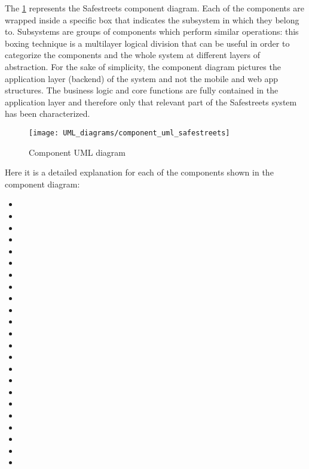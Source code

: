 The \ref{fig:component_diagram} represents the Safestreets component diagram. Each of the components are wrapped inside a specific box that indicates the subsystem in which they belong to.
\newline Subsystems are groups of components which perform similar operations: this boxing technique is a multilayer logical division that can be useful in order to categorize the components and the whole system at different layers of abstraction.
\newline For the sake of simplicity, the component diagram pictures the application layer (backend) of the system and not the mobile and web app structures. The business logic and core functions are fully contained in the application layer and therefore only that relevant part of the Safestreets system has been characterized.
\begin{figure}[H]
    \centering
    \texttt{[image: UML\_diagrams/component\_uml\_safestreets]}
    \caption{Component UML diagram}
    \label{fig:component_diagram}
\end{figure}
Here it is a detailed explanation for each of the components shown in the component diagram:
\begin{itemize}
    \item 
    \item 
    \item 
    \item 
    \item 
    \item 
    \item 
    \item 
    \item 
    \item 
    \item 
    \item 
    \item 
    \item 
    \item 
    \item 
    \item 
    \item 
    \item 
    \item 
    \item 
    \item 
    \item 
\end{itemize}